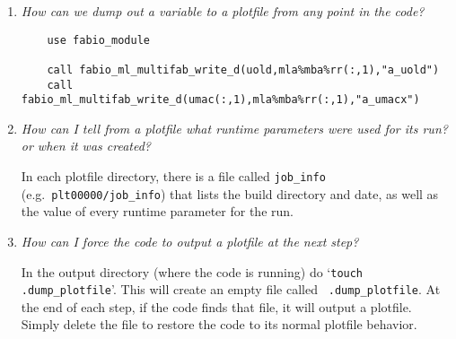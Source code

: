 \begin{enumerate}

\item {\em How can we dump out a variable to a plotfile from any point in the
   code?} 
%
\begin{verbatim}
    use fabio_module

    call fabio_ml_multifab_write_d(uold,mla%mba%rr(:,1),"a_uold")
    call fabio_ml_multifab_write_d(umac(:,1),mla%mba%rr(:,1),"a_umacx")
\end{verbatim}



\item {\em How can I tell from a plotfile what runtime parameters were
   used for its run? or when it was created?}

   In each plotfile directory, there is a file called {\tt job\_info}
   (e.g.\ {\tt plt00000/job\_info}) that lists the build directory and
   date, as well as the value of every runtime parameter for the run.


\item {\em How can I force the code to output a plotfile at the next
   step?}

   In the output directory (where the code is running) do `{\tt touch
     .dump\_plotfile}'.  This will create an empty file called {\tt
     .dump\_plotfile}.  At the end of each step, if the code finds
   that file, it will output a plotfile.  Simply delete the file to
   restore the code to its normal plotfile behavior.

\end{enumerate}
